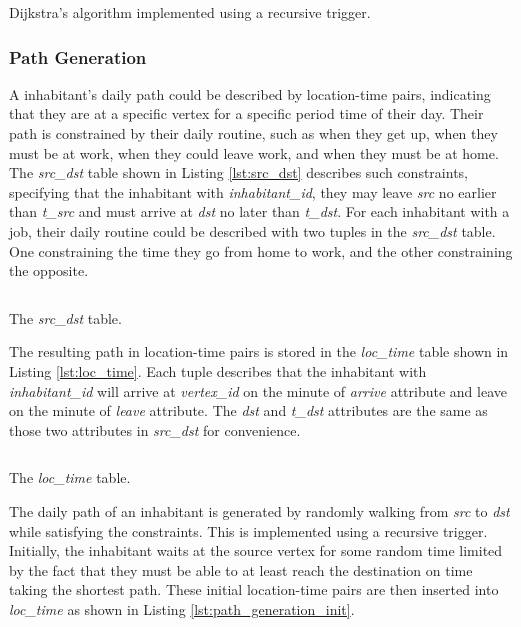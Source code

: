 \documentclass{article}
\begin{document}
\begin{listing}[H]
    \inputminted[firstline=34, lastline=50, breaklines=true]
    {sql}{shortest_path.sql}
    \caption{Dijkstra's algorithm implemented using a recursive trigger.}
    \label{lst:shortest_path}
\end{listing}

\subsubsection{Path Generation}

A inhabitant's daily path could be described by location-time pairs, indicating that they are at a specific vertex for a specific period time of their day. Their path is constrained by their daily routine, such as when they get up, when they must be at work, when they could leave work, and when they must be at home. The \textit{src\_dst} table shown in Listing \ref{lst:src_dst} describes such constraints, specifying that the inhabitant with \textit{inhabitant\_id}, they may leave \textit{src} no earlier than \textit{t\_src} and must arrive at \textit{dst} no later than \textit{t\_dst}. For each inhabitant with a job, their daily routine could be described with two tuples in the \textit{src\_dst} table. One constraining the time they go from home to work, and the other constraining the opposite.

\begin{listing}[H]
    \inputminted[firstline=17, lastline=24, breaklines=true]
    {sql}{init_loc_time.sql}
    \caption{The \textit{src\_dst} table.}
    \label{lst:src_dst}
\end{listing}

The resulting path in location-time pairs is stored in the \textit{loc\_time} table shown in Listing \ref{lst:loc_time}. Each tuple describes that the inhabitant with \textit{inhabitant\_id} will arrive at \textit{vertex\_id} on the minute of \textit{arrive} attribute and leave on the minute of \textit{leave} attribute. The \textit{dst} and \textit{t\_dst} attributes are the same as those two attributes in \textit{src\_dst} for convenience.

\begin{listing}[H]
    \inputminted[firstline=28, lastline=38, breaklines=true]
    {sql}{init_loc_time.sql}
    \caption{The \textit{loc\_time} table.}
    \label{lst:loc_time}
\end{listing}

The daily path of an inhabitant is generated by randomly walking from \textit{src} to \textit{dst} while satisfying the constraints. This is implemented using a recursive trigger. Initially, the inhabitant waits at the source vertex for some random time limited by the fact that they must be able to at least reach the destination on time taking the shortest path. These initial location-time pairs are then inserted into \textit{loc\_time} as shown in Listing \ref{lst:path_generation_init}.
\end{document}
